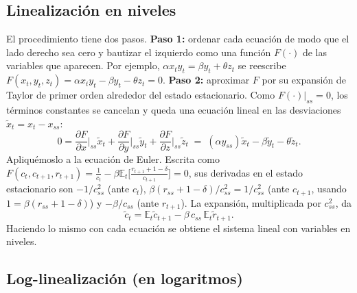 \documentclass[11pt,a4paper]{report}
\newcommand{\E}{\mathbb{E}}
\begin{document}
\subsection{Linealización en niveles}
\label{sec:linlevels}

El procedimiento tiene dos pasos. \textbf{Paso 1:} ordenar cada ecuación de modo que
el lado derecho sea cero y bautizar el izquierdo como una función $F(\cdot)$ de las
variables que aparecen. Por ejemplo, $\alpha x_t y_t=\beta y_t+\theta z_t$ se reescribe
$F(x_t,y_t,z_t)=\alpha x_t y_t-\beta y_t-\theta z_t=0$. \textbf{Paso 2:} aproximar
$F$ por su expansión de Taylor de primer orden alrededor del estado estacionario. Como
$F(\cdot)|_{ss}=0$, los términos constantes se cancelan y queda una ecuación lineal en
las desviaciones $\tilde{x}_t=x_t-x_{ss}$:
\[
0=\frac{\partial F}{\partial x}\Big|_{ss}\tilde{x}_t
+\frac{\partial F}{\partial y}\Big|_{ss}\tilde{y}_t
+\frac{\partial F}{\partial z}\Big|_{ss}\tilde{z}_t
\;=\;(\alpha y_{ss})\tilde{x}_t-\beta\tilde{y}_t-\theta\tilde{z}_t.
\]
Apliquémoslo a la ecuación de Euler. Escrita como
$F(c_t,c_{t+1},r_{t+1})=\tfrac{1}{c_t}-\beta\E_t\!\big[\tfrac{r_{t+1}+1-\delta}{c_{t+1}}\big]=0$,
sus derivadas en el estado estacionario son $-1/c_{ss}^2$ (ante $c_t$),
$\beta(r_{ss}+1-\delta)/c_{ss}^2=1/c_{ss}^2$ (ante $c_{t+1}$, usando $1=\beta(r_{ss}+1-\delta)$)
y $-\beta/c_{ss}$ (ante $r_{t+1}$). La expansión, multiplicada por $c_{ss}^2$, da
\begin{equation}
\tilde{c}_t=\E_t\tilde{c}_{t+1}-\beta\,c_{ss}\,\E_t\tilde{r}_{t+1}. \label{eq:lin_euler_lev}
\end{equation}
Haciendo lo mismo con cada ecuación se obtiene el sistema lineal con variables en
niveles.

\subsection{Log-linealización (en logaritmos)}
\label{sec:loglinlog}
\end{document}
